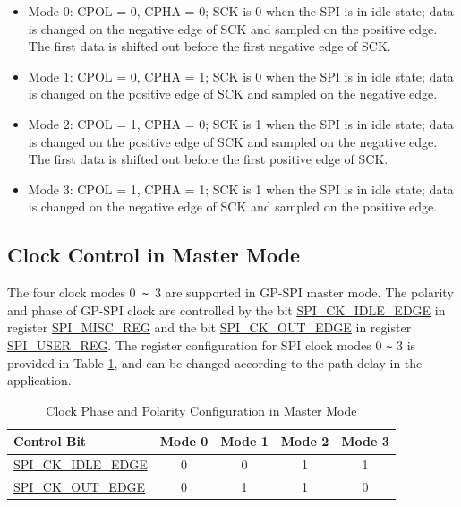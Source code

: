 \documentclass[main\_\_EN.tex]{subfiles}
\begin{document}
\begin{itemize}
    \item Mode 0: CPOL = 0, CPHA = 0; SCK is 0 when the SPI is in idle state; data is changed on the negative edge of SCK and sampled on the positive edge. The first data is shifted out before the first negative edge of SCK.

    \item Mode 1: CPOL = 0, CPHA = 1; SCK is 0 when the SPI is in idle state; data is changed on the positive edge of SCK and sampled on the negative edge.

    \item Mode 2: CPOL = 1, CPHA = 0; SCK is 1 when the SPI is in idle state; data is changed on the positive edge of SCK and sampled on the negative edge. The first data is shifted out before the first positive edge of SCK.

    \item Mode 3: CPOL = 1, CPHA = 1; SCK is 1 when the SPI is in idle state; data is changed on the negative edge of SCK and sampled on the positive edge.
\end{itemize}


\subsection{Clock Control in Master Mode}\label{GP-SPI master clock control}

The four clock modes 0\verb+ ~ +3 are supported in GP-SPI master mode. The polarity and phase of GP-SPI clock are controlled by the bit \hyperref[fielddesc:SPICKIDLEEDGE]{SPI\_CK\_IDLE\_EDGE} in register \hyperref[regdesc:SPIMISCREG]{SPI\_MISC\_REG} and the bit \hyperref[fielddesc:SPICKOUTEDGE]{SPI\_CK\_OUT\_EDGE} in register \hyperref[regdesc:SPIUSERREG]{SPI\_USER\_REG}. The register configuration for SPI clock modes 0 \verb+~+ 3 is provided in Table \ref{table:clock_pol_master}, and can be changed according to the path delay in the application.

\begin{table}[H]
    \centering
    \caption{Clock Phase and Polarity Configuration in Master Mode}
    \label{table:clock_pol_master}
    \begin{tabular}[c]{|p{3.5cm}|c|c|c|c|}
    \hline
    \rowcolor{lightgray}
    \textbf{Control Bit} & \textbf{Mode 0} & \textbf{Mode 1} & \textbf{Mode 2} & \textbf{Mode 3}\\
    \hline
    \hyperref[fielddesc:SPICKIDLEEDGE]{SPI\_CK\_IDLE\_EDGE}  & 0     & 0     & 1     & 1\\
    \hline
    \hyperref[fielddesc:SPICKOUTEDGE]{SPI\_CK\_OUT\_EDGE}   & 0     & 1     & 1     & 0\\
    \hline
    \end{tabular}
\end{table}
\end{document}

